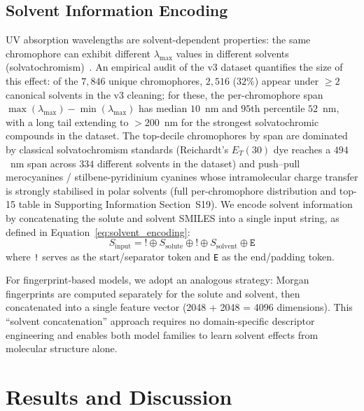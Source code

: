 \documentclass[journal=jcisd8,manuscript=article]{achemso}
\begin{document}
\subsection{Solvent Information Encoding}
\label{sec:solvent}

UV absorption wavelengths are solvent-dependent properties: the same chromophore can exhibit different $\lambda_{\max}$ values in different solvents (solvatochromism)~\cite{reichardt2011solvents}. An empirical audit of the v3 dataset quantifies the size of this effect: of the $7{,}846$ unique chromophores, $2{,}516$ ($32$\%) appear under $\geq 2$ canonical solvents in the v3 cleaning; for these, the per-chromophore span $\max(\lambda_{\max}) - \min(\lambda_{\max})$ has median $10$~nm and $95$th percentile $52$~nm, with a long tail extending to $> 200$~nm for the strongest solvatochromic compounds in the dataset. The top-decile chromophores by span are dominated by classical solvatochromism standards (Reichardt's $E_T(30)$ dye reaches a $494$~nm span across $334$ different solvents in the dataset) and push--pull merocyanines / stilbene-pyridinium cyanines whose intramolecular charge transfer is strongly stabilised in polar solvents (full per-chromophore distribution and top-15 table in Supporting Information Section~S19).
We encode solvent information by concatenating the solute and solvent SMILES into a single input string, as defined in Equation~\ref{eq:solvent_encoding}:
\begin{equation}
\label{eq:solvent_encoding}
 S_{\text{input}} = \texttt{!} \oplus S_{\text{solute}} \oplus \texttt{!} \oplus S_{\text{solvent}} \oplus \texttt{E}
\end{equation}
where \texttt{!} serves as the start/separator token and \texttt{E} as the end/padding token.

For fingerprint-based models, we adopt an analogous strategy: Morgan fingerprints are computed separately for the solute and solvent, then concatenated into a single feature vector (2048 + 2048 = 4096 dimensions).
This ``solvent concatenation'' approach requires no domain-specific descriptor engineering and enables both model families to learn solvent effects from molecular structure alone.


\section{Results and Discussion}
\label{sec:results}
\end{document}
